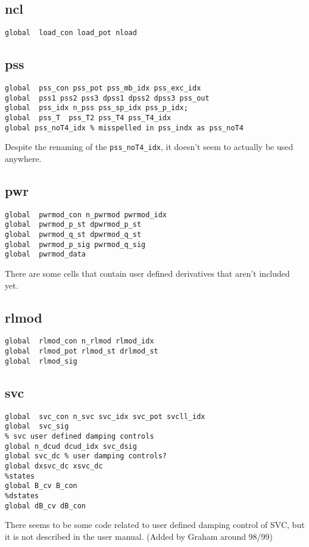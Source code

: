 \subsection{ncl}
\begin{verbatim}
global  load_con load_pot nload
\end{verbatim}

\subsection{pss}
\begin{verbatim}
global  pss_con pss_pot pss_mb_idx pss_exc_idx
global  pss1 pss2 pss3 dpss1 dpss2 dpss3 pss_out
global  pss_idx n_pss pss_sp_idx pss_p_idx;
global  pss_T  pss_T2 pss_T4 pss_T4_idx  
global pss_noT4_idx % misspelled in pss_indx as pss_noT4
\end{verbatim}
Despite the renaming of the \verb|pss_noT4_idx|, it doesn't seem to actually be used anywhere.


\subsection{pwr}
\begin{verbatim}
global  pwrmod_con n_pwrmod pwrmod_idx
global  pwrmod_p_st dpwrmod_p_st
global  pwrmod_q_st dpwrmod_q_st
global  pwrmod_p_sig pwrmod_q_sig
global  pwrmod_data
\end{verbatim}
There are some cells that contain user defined derivatives that aren't included yet.


\subsection{rlmod}
\begin{verbatim}
global  rlmod_con n_rlmod rlmod_idx
global  rlmod_pot rlmod_st drlmod_st
global  rlmod_sig
\end{verbatim}

\subsection{svc}
\begin{verbatim}
global  svc_con n_svc svc_idx svc_pot svcll_idx
global  svc_sig
% svc user defined damping controls
global n_dcud dcud_idx svc_dsig
global svc_dc % user damping controls?
global dxsvc_dc xsvc_dc
%states
global B_cv B_con
%dstates
global dB_cv dB_con
\end{verbatim}
There seems to be some code related to user defined damping control of SVC, but it is not described in the user manual. 
(Added by Graham around 98/99)


